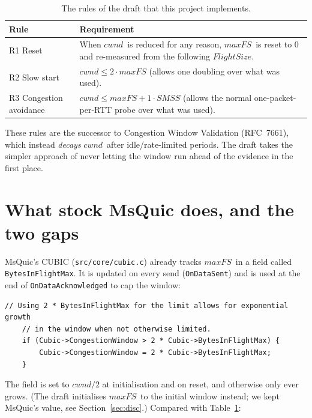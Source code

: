 \documentclass[11pt,a4paper]{article}
\newcommand{\maxfs}{\ensuremath{\mathit{maxFS}}}
\newcommand{\cwnd}{\ensuremath{\mathit{cwnd}}}
\newcommand{\smss}{\ensuremath{\mathit{SMSS}}}
\newcommand{\fs}{\ensuremath{\mathit{FlightSize}}}
\begin{document}
\begin{table}[ht]
\centering
\caption{The rules of the draft that this project implements.}
\label{tab:rules}
\begin{tabularx}{\textwidth}{@{}l X@{}}
\toprule
\textbf{Rule} & \textbf{Requirement} \\
\midrule
R1 Reset & When \cwnd\ is reduced for any reason, \maxfs\ is reset to 0 and
           re-measured from the following \fs. \\
R2 Slow start & $\cwnd \le 2\cdot\maxfs$ (allows one doubling over what was used). \\
R3 Congestion avoidance & $\cwnd \le \maxfs + 1\cdot\smss$ (allows the normal
           one-packet-per-RTT probe over what was used). \\
\bottomrule
\end{tabularx}
\end{table}

These rules are the successor to Congestion Window Validation (RFC~7661),
which instead \emph{decays} \cwnd\ after idle/rate-limited periods. The draft
takes the simpler approach of never letting the window run ahead of the
evidence in the first place.

\section{What stock MsQuic does, and the two gaps}
\label{sec:gaps}

MsQuic's CUBIC (\texttt{src/core/cubic.c}) already tracks \maxfs\ in a
field called \texttt{BytesInFlightMax}. It is updated on every send
(\texttt{OnDataSent}) and is used at the end of
\texttt{OnDataAcknowledged} to cap the window:

\begin{lstlisting}[title={\footnotesize Stock \texttt{cubic.c}, end of \texttt{OnDataAcknowledged}}]
    // Using 2 * BytesInFlightMax for the limit allows for exponential growth
    // in the window when not otherwise limited.
    if (Cubic->CongestionWindow > 2 * Cubic->BytesInFlightMax) {
        Cubic->CongestionWindow = 2 * Cubic->BytesInFlightMax;
    }
\end{lstlisting}

The field is set to $\cwnd/2$ at initialisation and on reset, and
otherwise only ever grows. (The draft initialises \maxfs\ to the initial
window instead; we kept MsQuic's value, see Section~\ref{sec:disc}.) Compared with Table~\ref{tab:rules}:
\end{document}
